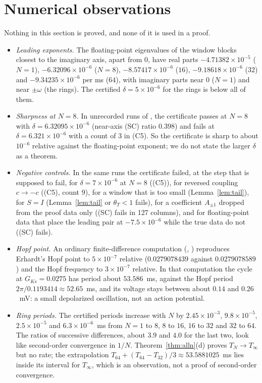 \documentclass[11pt]{article}
\theoremstyle{definition}
\begin{document}
\section{Numerical observations}\label{sec:numerics}

Nothing in this section is proved, and none of it is used in a proof.

\begin{itemize}
\item \emph{Leading exponents.} The floating-point eigenvalues of the window blocks closest to the imaginary axis, apart from $0$, have real parts $-4.71382 \times 10^{-5}$ ($N = 1$), $-6.32096 \times 10^{-6}$ ($N = 8$), $-8.57417 \times 10^{-6}$ ($16$), $-9.18618 \times 10^{-6}$ ($32$) and $-9.34235 \times 10^{-6}$ per ms ($64$), with imaginary parts near $0$ ($N = 1$) and near $\pm\omega$ (the rings). The certified $\delta = 5 \times 10^{-6}$ for the rings is below all of them.
\item \emph{Sharpness at $N = 8$.} In unrecorded runs of , the certificate passes at $N = 8$ with $\delta = 6.32095 \times 10^{-6}$ (near-axis (SC) ratio $0.398$) and fails at $\delta = 6.321 \times 10^{-6}$ with a count of $3$ in (C5). So the certificate is sharp to about $10^{-6}$ relative against the floating-point exponent; we do not state the larger $\delta$ as a theorem.
\item \emph{Negative controls.} In the same runs the certificate failed, at the step that is supposed to fail, for $\delta = 7 \times 10^{-6}$ at $N = 8$ ((C5)), for reversed coupling $c \to -c$ ((C5), count $9$), for a window that is too small (Lemma~\ref{lem:tail}), for $S = I$ (Lemma~\ref{lem:tail} or $\theta_T < 1$ fails), for a coefficient $A_{\pm1}$ dropped from the proof data only ((SC) fails in 127 columns), and for floating-point data that place the leading pair at $-7.5 \times 10^{-6}$ while the true data do not ((SC) fails).
\item \emph{Hopf point.} An ordinary finite-difference computation (, ) reproduces Erhardt's Hopf point to $5 \times 10^{-7}$ relative ($0.0279078439$ against $0.0279078589$) and the Hopf frequency to $3 \times 10^{-7}$ relative. In that computation the cycle at $G_{Ks} = 0.0275$ has period about $53.586$~ms, against the Hopf period $2\pi/0.1193414 \approx 52.65$~ms, and its voltage stays between about $0.14$ and $0.26$~mV: a small depolarized oscillation, not an action potential.
\item \emph{Ring periods.} The certified periods increase with $N$ by $2.45 \times 10^{-3}$, $9.8 \times 10^{-5}$, $2.5 \times 10^{-5}$ and $6.3 \times 10^{-6}$~ms from $N = 1$ to $8$, $8$ to $16$, $16$ to $32$ and $32$ to $64$. The ratios of successive differences, about $3.9$ and $4.0$ for the last two, look like second-order convergence in $1/N$. Theorem~\ref{thm:alln}(d) proves $T_N \to T_\infty$ but no rate; the extrapolation $T_{64} + (T_{64} - T_{32})/3 \approx 53.5881025$~ms lies inside its interval for $T_\infty$, which is an observation, not a proof of second-order convergence.

\end{itemize}
\end{document}
